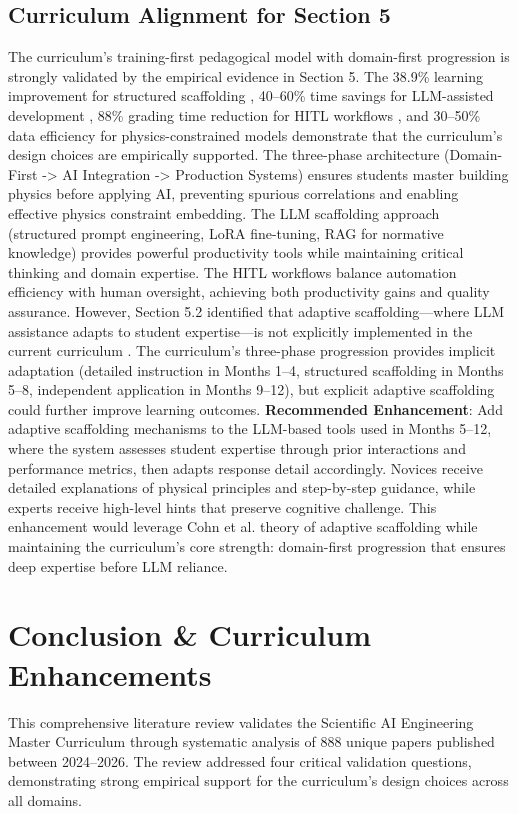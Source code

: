 \documentclass[12pt,a4paper]{article}
\begin{document}
\subsection{Curriculum Alignment for Section 5}
The curriculum's training-first pedagogical model with domain-first progression is strongly validated by the empirical evidence in Section 5. The 38.9\% learning improvement for structured scaffolding \cite{ref4}, 40--60\% time savings for LLM-assisted development \cite{ref61}, 88\% grading time reduction for HITL workflows \cite{ref19}, and 30--50\% data efficiency for physics-constrained models \cite{ref265} demonstrate that the curriculum's design choices are empirically supported.
The three-phase architecture (Domain-First -> AI Integration -> Production Systems) ensures students master building physics before applying AI, preventing spurious correlations and enabling effective physics constraint embedding. The LLM scaffolding approach (structured prompt engineering, LoRA fine-tuning, RAG for normative knowledge) provides powerful productivity tools while maintaining critical thinking and domain expertise. The HITL workflows balance automation efficiency with human oversight, achieving both productivity gains and quality assurance.
However, Section 5.2 identified that adaptive scaffolding---where LLM assistance adapts to student expertise---is not explicitly implemented in the current curriculum \cite{ref4}. The curriculum's three-phase progression provides implicit adaptation (detailed instruction in Months 1--4, structured scaffolding in Months 5--8, independent application in Months 9--12), but explicit adaptive scaffolding could further improve learning outcomes.
\textbf{Recommended Enhancement}: Add adaptive scaffolding mechanisms to the LLM-based tools used in Months 5--12, where the system assesses student expertise through prior interactions and performance metrics, then adapts response detail accordingly. Novices receive detailed explanations of physical principles and step-by-step guidance, while experts receive high-level hints that preserve cognitive challenge. This enhancement would leverage Cohn et al. theory of adaptive scaffolding \cite{ref4} while maintaining the curriculum's core strength: domain-first progression that ensures deep expertise before LLM reliance.
\section{Conclusion \& Curriculum Enhancements}
This comprehensive literature review validates the Scientific AI Engineering Master Curriculum through systematic analysis of 888 unique papers published between 2024--2026. The review addressed four critical validation questions, demonstrating strong empirical support for the curriculum's design choices across all domains.
\end{document}
